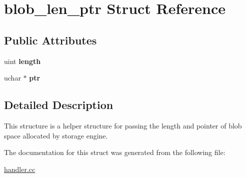 \hypertarget{structblob__len__ptr}{}\section{blob\+\_\+len\+\_\+ptr Struct Reference}
\label{structblob__len__ptr}
\subsection*{Public Attributes}
\begin{DoxyCompactItemize}
\item 
\mbox{\label{structblob__len__ptr_a31ce84e6ba085a04492f8a44f1098af6}} 
uint {\bfseries length}
\item 
\mbox{\label{structblob__len__ptr_a2656b6eb9b3c37915ef9bda72d635311}} 
uchar $\ast$ {\bfseries ptr}
\end{DoxyCompactItemize}


\subsection{Detailed Description}
This structure is a helper structure for passing the length and pointer of blob space allocated by storage engine. 

The documentation for this struct was generated from the following file\+:\begin{DoxyCompactItemize}
\item 
\mbox{\hyperlink{handler_8cc}{handler.\+cc}}\end{DoxyCompactItemize}
